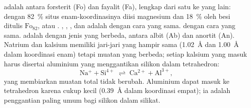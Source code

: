  adalah  antara forsterit  (Fo) dan fayalit  (Fa), lengkap dari satu  ke yang lain:  dengan \qty{82}{\percent} situs enam-koordinasinya diisi magnesium dan \qty{18}{\percent} oleh besi ditulis $\text{Fo}_{82}$, atau . , , , dan  adalah  dengan cara yang sama.
 dengan cara yang sama.   adalah  dengan jenis yang berbeda, antara albit  (Ab) dan anortit  (An). Natrium dan kalsium memiliki jari-jari yang hampir sama (\qty{1.02}{\angstrom} dan \qty{1.00}{\angstrom} dalam koordinasi enam) tetapi muatan yang berbeda; setiap kalsium yang masuk harus disertai aluminium yang menggantikan silikon dalam tetrahedron:
\[
  \mathrm{Na^{+}} + \mathrm{Si^{4+}} \;\rightleftharpoons\; \mathrm{Ca^{2+}} + \mathrm{Al^{3+}},
\]
 yang membiarkan muatan total tidak berubah.
Aluminium dapat masuk ke tetrahedron karena cukup kecil (\qty{0.39}{\angstrom} dalam koordinasi empat); ia adalah penggantian paling umum bagi silikon dalam silikat.


